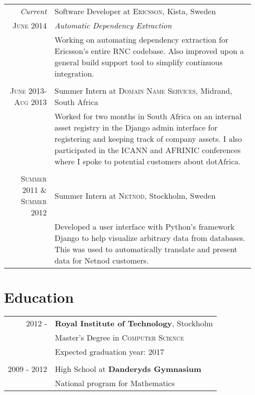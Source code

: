 \documentclass[a4paper,10pt]{article} %
\begin{document}
\begin{tabular}{r|p{11cm}}
\emph{Current} & Software Developer at \textsc{Ericsson}, Kista, Sweden \\
\textsc{June 2014} & \emph{Automatic Dependency Extraction}\\ 
& \footnotesize{Working on automating dependency extraction for Ericsson’s entire RNC codebase. Also improved upon a general build support tool to simplify continuous integration.}\\
\multicolumn{2}{c}{} \\


\textsc{June 2013-Aug 2013} & Summer Intern at \textsc{Domain Name Services}, Midrand, South Africa \emph{}\\
& \footnotesize{Worked for two months in South Africa on an internal asset registry in the Django admin interface for registering and keeping track of company assets. I also participated in the ICANN and AFRINIC conferences where I spoke to potential customers about dotAfrica.}\\
\multicolumn{2}{c}{} \\


\textsc{Summer 2011 \& Summer 2012} & Summer Intern at \textsc{Netnod}, Stockholm, Sweden \emph{}\\
& \footnotesize{Developed a user interface with Python’s framework Django to help visualize arbitrary data from databases. This was used to automatically translate and present data for Netnod customers.}
\end{tabular}


\section{Education}

\begin{tabular}{rl}	
\textsc{2012 - } & \textbf{Royal Institute of Technology}, Stockholm\\
& Master's Degree in \textsc{Computer Science}\\
& Expected graduation year: 2017\\
&\\


\textsc{2009 - 2012} & High School at \textbf{Danderyds Gymnasium}\\&National program for Mathematics\\

\end{tabular}
\end{document}
